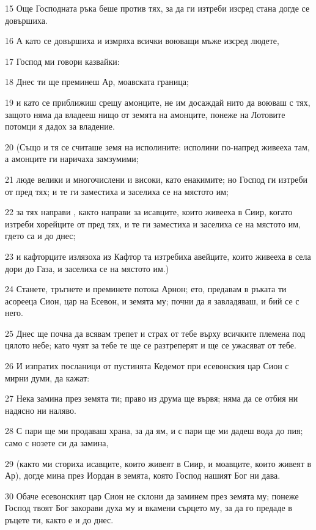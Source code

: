 \par 15 Още Господната ръка беше против тях, за да ги изтреби изсред стана догде се довършиха.
\par 16 А като се довършиха и измряха всички воюващи мъже изсред людете,
\par 17 Господ ми говори казвайки:
\par 18 Днес ти ще преминеш Ар, моавската граница;
\par 19 и като се приближиш срещу амонците, не им досаждай нито да воюваш с тях, защото няма да владееш нищо от земята на амонците, понеже на Лотовите потомци я дадох за владение.
\par 20 (Също и тя се считаше земя на исполините: исполини по-напред живееха там, а амонците ги наричаха замзумими;
\par 21 люде велики и многочислени и високи, като енакимите; но Господ ги изтреби от пред тях; и те ги заместиха и заселиха се на мястото им;
\par 22 за тях направи , както направи за исавците, които живееха в Сиир, когато изтреби хорейците от пред тях, и те ги заместиха и заселиха се на мястото им, гдето са и до днес;
\par 23 и кафторците излязоха из Кафтор та изтребиха авейците, които живееха в села дори до Газа, и заселиха се на мястото им.)
\par 24 Станете, тръгнете и преминете потока Арнон; ето, предавам в ръката ти асорееца Сион, цар на Есевон, и земята му; почни да я завладяваш, и бий се с него.
\par 25 Днес ще почна да всявам трепет и страх от тебе върху всичките племена под цялото небе; като чуят за тебе те ще се разтреперят и ще се ужасяват от тебе.
\par 26 И изпратих посланици от пустинята Кедемот при есевонския цар Сион с мирни думи, да кажат:
\par 27 Нека замина през земята ти; право из друма ще вървя; няма да се отбия ни надясно ни наляво.
\par 28 С пари ще ми продаваш храна, за да ям, и с пари ще ми дадеш вода до пия; само с нозете си да замина,
\par 29 (както ми сториха исавците, които живеят в Сиир, и моавците, които живеят в Ар), догде мина през Иордан в земята, която Господ нашият Бог ни дава.
\par 30 Обаче есевонският цар Сион не склони да заминем през земята му; понеже Господ твоят Бог закорави духа му и вкамени сърцето му, за да го предаде в ръцете ти, както е и до днес.
